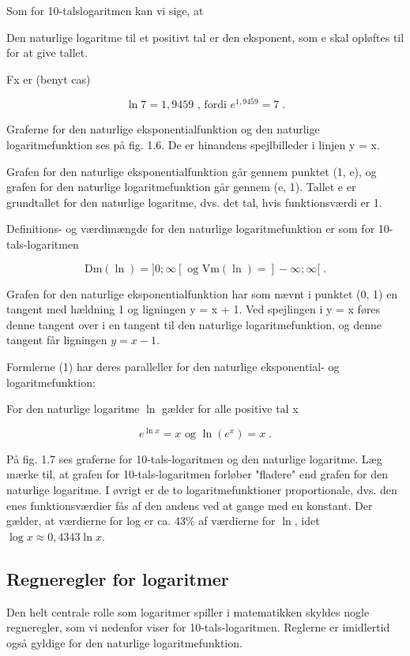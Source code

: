 \documentclass[12pt,oneside,a4paper]{article}
\theoremstyle{plain}
\begin{document}
Som for 10-talslogaritmen kan vi sige, at

Den naturlige logaritme til et positivt tal er den eksponent, som e skal
opløftes til for at give tallet.

Fx er (benyt cas)

\[
\ln 7 = 1,9459 \text{ , fordi } e^{1,9459} = 7 \; .
\]

Graferne for den naturlige eksponentialfunktion og den naturlige
logaritmefunktion ses på fig. 1.6. De er hinandens spejlbilleder i linjen y =
x.

Grafen for den naturlige eksponentialfunktion går gennem punktet (1, e), og
grafen for den naturlige logaritmefunktion går gennem (e, 1). Tallet e er
grundtallet for den naturlige logaritme, dvs. det tal, hvis funktionsværdi er
1.

Definitions- og værdimængde for den naturlige logaritmefunktion er som for
10-tals-logaritmen

\[
\mathrm{Dm}(\ln) = ]0; \infty[ \text{ og } \mathrm{Vm}(\ln) = ]-\infty; \infty[ \; .
\]

Grafen for den naturlige eksponentialfunktion har som nævnt i punktet (0, 1) en
tangent med hældning 1 og ligningen y = x + 1. Ved spejlingen i y = x føres
denne tangent over i en tangent til den naturlige logaritmefunktion, og denne
tangent får ligningen $y = x - 1$.

Formlerne (1) har deres paralleller for den naturlige eksponential- og
logaritmefunktion:

For den naturlige logaritme $\ln$ gælder for alle positive tal x

\[
\tag{2} e^{\ln x} = x \text{ og } \ln (e^x) = x \; .
\]

På fig. 1.7 ses graferne for 10-tals-logaritmen og den naturlige logaritme. Læg
mærke til, at grafen for 10-tals-logaritmen forløber "fladere" end grafen for
den naturlige logaritme. I øvrigt er de to logaritmefunktioner proportionale,
dvs. den enes funktionsværdier fås af den andens ved at gange med en konstant.
Der gælder, at værdierne for log er ca. 43\% af værdierne for $\ln$, idet $\log x
\approx 0,4343 \ln x$.

\subsection*{Regneregler for logaritmer}

Den helt centrale rolle som logaritmer spiller i matematikken skyldes nogle
regneregler, som vi nedenfor viser for 10-tals-logaritmen. Reglerne er
imidlertid også gyldige for den naturlige logaritmefunktion.
\end{document}
